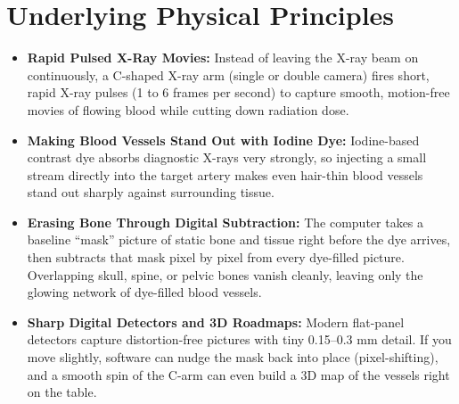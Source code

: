 \section{Underlying Physical Principles}
\begin{itemize}
\item \textbf{Rapid Pulsed X-Ray Movies:} Instead of leaving the X-ray beam on continuously, a C-shaped X-ray arm (single or double camera) fires short, rapid X-ray pulses (1 to 6 frames per second) to capture smooth, motion-free movies of flowing blood while cutting down radiation dose.
\item \textbf{Making Blood Vessels Stand Out with Iodine Dye:} Iodine-based contrast dye absorbs diagnostic X-rays very strongly, so injecting a small stream directly into the target artery makes even hair-thin blood vessels stand out sharply against surrounding tissue.
\item \textbf{Erasing Bone Through Digital Subtraction:} The computer takes a baseline ``mask'' picture of static bone and tissue right before the dye arrives, then subtracts that mask pixel by pixel from every dye-filled picture. Overlapping skull, spine, or pelvic bones vanish cleanly, leaving only the glowing network of dye-filled blood vessels.
\item \textbf{Sharp Digital Detectors and 3D Roadmaps:} Modern flat-panel detectors capture distortion-free pictures with tiny 0.15--0.3 mm detail. If you move slightly, software can nudge the mask back into place (pixel-shifting), and a smooth spin of the C-arm can even build a 3D map of the vessels right on the table.
\end{itemize}

